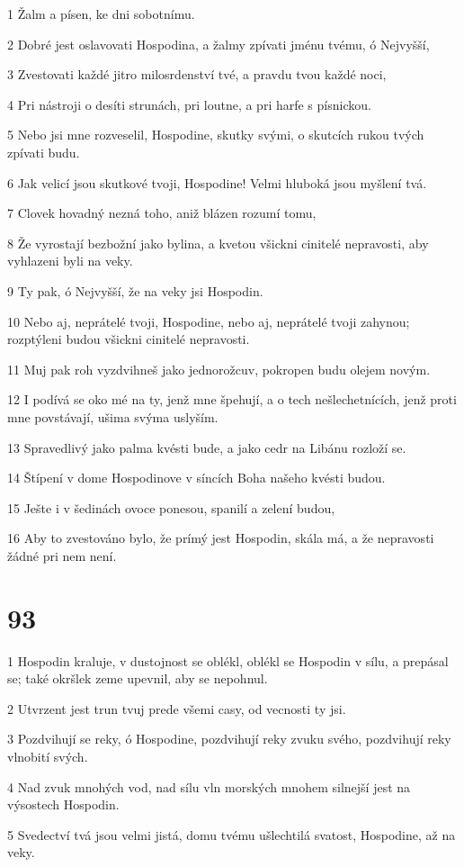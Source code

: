 \par 1 Žalm a písen, ke dni sobotnímu.
\par 2 Dobré jest oslavovati Hospodina, a žalmy zpívati jménu tvému, ó Nejvyšší,
\par 3 Zvestovati každé jitro milosrdenství tvé, a pravdu tvou každé noci,
\par 4 Pri nástroji o desíti strunách, pri loutne, a pri harfe s písnickou.
\par 5 Nebo jsi mne rozveselil, Hospodine, skutky svými, o skutcích rukou tvých zpívati budu.
\par 6 Jak velicí jsou skutkové tvoji, Hospodine! Velmi hluboká jsou myšlení tvá.
\par 7 Clovek hovadný nezná toho, aniž blázen rozumí tomu,
\par 8 Že vyrostají bezbožní jako bylina, a kvetou všickni cinitelé nepravosti, aby vyhlazeni byli na veky.
\par 9 Ty pak, ó Nejvyšší, že na veky jsi Hospodin.
\par 10 Nebo aj, neprátelé tvoji, Hospodine, nebo aj, neprátelé tvoji zahynou; rozptýleni budou všickni cinitelé nepravosti.
\par 11 Muj pak roh vyzdvihneš jako jednorožcuv, pokropen budu olejem novým.
\par 12 I podívá se oko mé na ty, jenž mne špehují, a o tech nešlechetnících, jenž proti mne povstávají, ušima svýma uslyším.
\par 13 Spravedlivý jako palma kvésti bude, a jako cedr na Libánu rozloží se.
\par 14 Štípení v dome Hospodinove v síncích Boha našeho kvésti budou.
\par 15 Ješte i v šedinách ovoce ponesou, spanilí a zelení budou,
\par 16 Aby to zvestováno bylo, že prímý jest Hospodin, skála má, a že nepravosti žádné pri nem není.

\chapter{93}

\par 1 Hospodin kraluje, v dustojnost se oblékl, oblékl se Hospodin v sílu, a prepásal se; také okršlek zeme upevnil, aby se nepohnul.
\par 2 Utvrzent jest trun tvuj prede všemi casy, od vecnosti ty jsi.
\par 3 Pozdvihují se reky, ó Hospodine, pozdvihují reky zvuku svého, pozdvihují reky vlnobití svých.
\par 4 Nad zvuk mnohých vod, nad sílu vln morských mnohem silnejší jest na výsostech Hospodin.
\par 5 Svedectví tvá jsou velmi jistá, domu tvému ušlechtilá svatost, Hospodine, až na veky.

